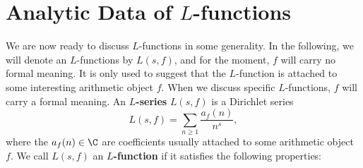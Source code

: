   \section{Analytic Data of \texorpdfstring{$L$}{L}-functions}
    We are now ready to discuss $L$-functions in some generality. In the following, we will denote an $L$-functions by $L(s,f)$, and for the moment, $f$ will carry no formal meaning. It is only used to suggest that the $L$-function is attached to some interesting arithmetic object $f$. When we discuss specific $L$-functions, $f$ will carry a formal meaning. An \textbf{$L$-series} $L(s,f)$ is a Dirichlet series
    \[
      L(s,f) = \sum_{n \ge 1}\frac{a_{f}(n)}{n^{s}},
    \]
    where the $a_{f}(n) \in \C$ are coefficients usually attached to some arithmetic object $f$. We call $L(s,f)$ an \textbf{$L$-function} if it satisfies the following properties:
